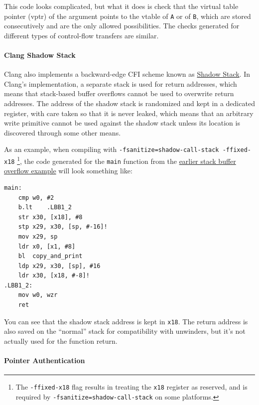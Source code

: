 \documentclass[
  a4paper,
]{report}
\begin{document}
This code looks complicated, but what it does is check that the virtual
table pointer (vptr) of the argument points to the vtable of \texttt{A}
or of \texttt{B}, which are stored consecutively and are the only
allowed possibilities. The checks generated for different types of
control-flow transfers are similar.

\paragraph{Clang Shadow Stack}\label{sec:clang-shadow-stack}

Clang also implements a backward-edge CFI scheme known as
\href{https://clang.llvm.org/docs/ShadowCallStack.html}{\label{__index_entry_47}{Shadow
Stack}}. In Clang's implementation, a separate stack
is used for return addresses, which means that stack-based buffer
overflows cannot be used to overwrite return addresses. The address of
the shadow stack is randomized and kept in a dedicated register, with
care taken so that it is never leaked, which means that an arbitrary
write primitive cannot be used against the shadow stack unless its
location is discovered through some other means.

As an example, when compiling with
\texttt{-fsanitize=shadow-call-stack\ -ffixed-x18} \footnote{The
  \texttt{-ffixed-x18} flag results in treating the \texttt{x18}
  register as reserved, and is required by
  \texttt{-fsanitize=shadow-call-stack} on some platforms.}, the code
generated for the \texttt{main} function from the
\hyperref[stack-buffer-overflow]{earlier stack buffer overflow example}
will look something like:

\begin{verbatim}
main:
    cmp w0, #2
    b.lt    .LBB1_2
    str x30, [x18], #8
    stp x29, x30, [sp, #-16]!
    mov x29, sp
    ldr x0, [x1, #8]
    bl  copy_and_print
    ldp x29, x30, [sp], #16
    ldr x30, [x18, #-8]!
.LBB1_2:
    mov w0, wzr
    ret
\end{verbatim}

You can see that the shadow stack address is kept in \texttt{x18}. The
return address is also saved on the ``normal'' stack for compatibility
with unwinders, but it's not actually used for the function return.

\paragraph{Pointer Authentication}\label{sec:pointer-authentication}
\end{document}
